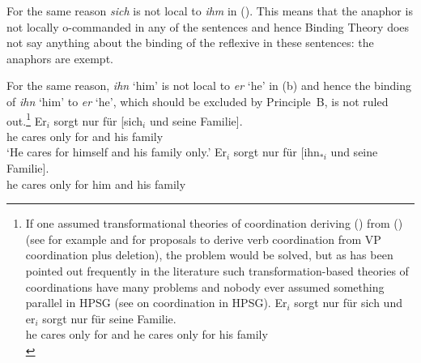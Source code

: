 \documentclass[output=paper,biblatex,babelshorthands,newtxmath,draftmode,colorlinks,citecolor=brown]{langscibook}
\begin{document}
For the same reason \emph{sich} is not local to \emph{ihm} in (). This means that the anaphor is not locally o-commanded in any
of the sentences and hence Binding Theory does not say anything about the binding of the reflexive
in these sentences: the anaphors are exempt. 
%

For the same reason, \emph{ihn} `him' is not local to \emph{er} `he' in (b) and hence the
binding of \emph{ihn} `him' to \emph{er} `he', which should be excluded by Principle~B, is not ruled
out.\footnote{
If one assumed transformational theories of coordination deriving () from () (see for example
\citealp[]{WC80a-u} and \citealp[, 67]{Kayne94a-u} for proposals to derive verb
coordination from VP coordination plus deletion), the problem would be solved, but as has been
pointed out frequently in the literature such transformation-based theories of coordinations have
many problems \parencites[]{BV72}[--193]{Jackendoff77a}[]{Dowty79a}[--105]{denBesten83a}{Klein85}{Eisenberg94a}[]{Borsley2005a} and nobody ever assumed
something parallel in HPSG (see  on coordination in HPSG).
\ea
\gll Er$_{i}$ sorgt nur für sich     und er$_{i}$ sorgt nur für seine Familie.\\
     he      cares only for \self{} and he       cares only for his family\\
\z
}
\eal
\label{ex-sorgt-fuer-sich-und-seine-familie}
\ex
\gll Er$_{i}$ sorgt nur für [sich$_{i}$ und seine Familie].\\
     he      cares only for \spacebr{}\self{} and his family\\
\glt `He cares for himself and his family only.'
\ex 
\gll Er$_{i}$ sorgt nur für [ihn$_{*i}$ und seine Familie].\\
     he      cares only for \spacebr{}him and his family\\
\zl
\end{document}
